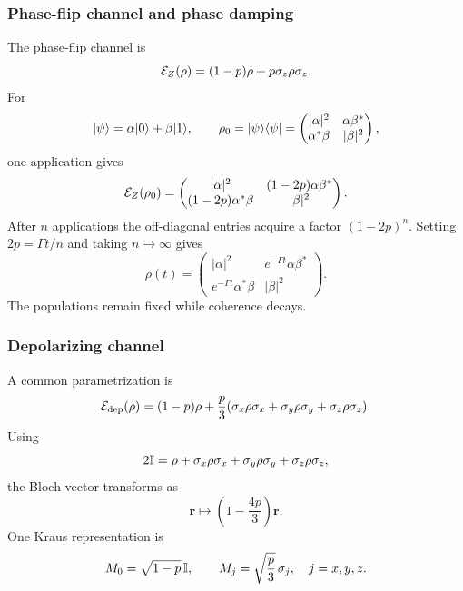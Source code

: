 \subsubsection{Phase-flip channel and phase damping}
The phase-flip channel is
\begin{equation}
 \mathcal{E}_Z(\rho)=(1-p)\rho+p\sigma_z\rho\sigma_z.
\end{equation}
For
\begin{equation}
 |{\psi}\rangle=\alpha|{0}\rangle+\beta|{1}\rangle,
 \qquad
 \rho_0=|\psi\rangle\langle\psi|
 =\begin{pmatrix}|\alpha|^2&\alpha\beta^*\\
 \alpha^*\beta&|\beta|^2\end{pmatrix},
\end{equation}
one application gives
\begin{equation}
 \mathcal{E}_Z(\rho_0)=
 \begin{pmatrix}|\alpha|^2&(1-2p)\alpha\beta^*\\
 (1-2p)\alpha^*\beta&|\beta|^2\end{pmatrix}.
\end{equation}
After $n$ applications the off-diagonal entries acquire a factor
$(1-2p)^n$. Setting $2p=\Gamma t/n$ and taking $n\to\infty$ gives
\begin{equation}
 \rho(t)=\begin{pmatrix}
 |\alpha|^2&e^{-\Gamma t}\alpha\beta^*\\
 e^{-\Gamma t}\alpha^*\beta&|\beta|^2
 \end{pmatrix}.
\end{equation}
The populations remain fixed while coherence decays.

\subsubsection{Depolarizing channel}
A common parametrization is
\begin{equation}
 \mathcal{E}_{\mathrm{dep}}(\rho)=(1-p)\rho+\frac p3
 (\sigma_x\rho\sigma_x+\sigma_y\rho\sigma_y+\sigma_z\rho\sigma_z).
\end{equation}
Using
\begin{equation}
 2\mathbb{I}=\rho+\sigma_x\rho\sigma_x+\sigma_y\rho\sigma_y+\sigma_z\rho\sigma_z,
\end{equation}
the Bloch vector transforms as
\begin{equation}
 \bm r\longmapsto\left(1-\frac{4p}{3}\right)\bm r.
\end{equation}
One Kraus representation is
\begin{equation}
 M_0=\sqrt{1-p}\,\mathbb{I},
 \qquad M_j=\sqrt{\frac p3}\,\sigma_j,
 \quad j=x,y,z.
\end{equation}


